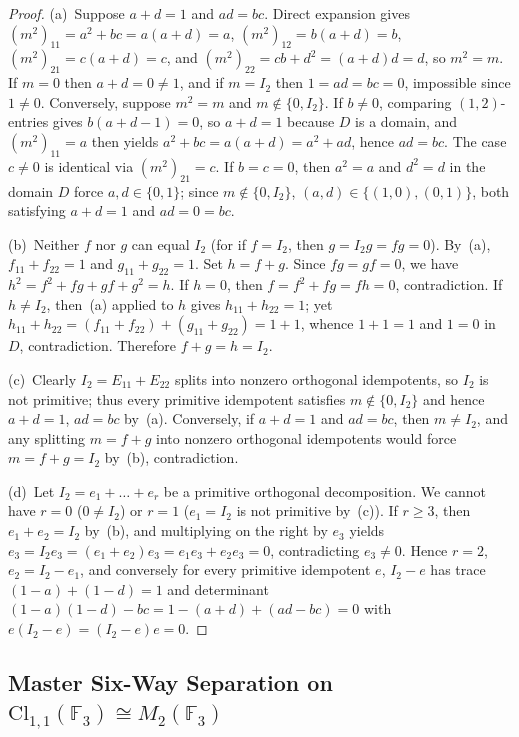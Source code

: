 \documentclass[11pt]{article}
\theoremstyle{definition}
\newcommand{\Cl}{\mathrm{Cl}}
\newcommand{\Mat}{M}
\newcommand{\F}{\mathbb{F}}
\begin{document}
\begin{proof}
(a)~Suppose $a + d = 1$ and $ad = bc$. Direct expansion gives
$(m^2)_{11} = a^2 + bc = a(a+d) = a$, $(m^2)_{12} = b(a+d) = b$,
$(m^2)_{21} = c(a+d) = c$, and $(m^2)_{22} = cb + d^2 = (a+d)d = d$, so
$m^2 = m$. If $m = 0$ then $a + d = 0 \neq 1$, and if $m = I_2$ then
$1 = ad = bc = 0$, impossible since $1 \neq 0$. Conversely, suppose $m^2 = m$
and $m \notin \{0, I_2\}$. If $b \neq 0$, comparing $(1,2)$-entries gives
$b(a+d-1) = 0$, so $a + d = 1$ because $D$ is a domain, and $(m^2)_{11} = a$
then yields $a^2 + bc = a(a+d) = a^2 + ad$, hence $ad = bc$. The case $c \neq 0$
is identical via $(m^2)_{21} = c$. If $b = c = 0$, then $a^2 = a$ and $d^2 = d$
in the domain $D$ force $a, d \in \{0,1\}$; since $m \notin \{0, I_2\}$,
$(a,d) \in \{(1,0),(0,1)\}$, both satisfying $a + d = 1$ and $ad = 0 = bc$.

(b)~Neither $f$ nor $g$ can equal $I_2$ (for if $f = I_2$, then $g = I_2 g = fg = 0$).
By~(a), $f_{11} + f_{22} = 1$ and $g_{11} + g_{22} = 1$. Set $h = f + g$. Since
$fg = gf = 0$, we have $h^2 = f^2 + fg + gf + g^2 = h$. If $h = 0$, then
$f = f^2 + fg = fh = 0$, contradiction. If $h \neq I_2$, then~(a) applied to $h$
gives $h_{11} + h_{22} = 1$; yet $h_{11} + h_{22} = (f_{11} + f_{22}) +
(g_{11} + g_{22}) = 1 + 1$, whence $1 + 1 = 1$ and $1 = 0$ in $D$, contradiction.
Therefore $f + g = h = I_2$.

(c)~Clearly $I_2 = E_{11} + E_{22}$ splits into nonzero orthogonal idempotents,
so $I_2$ is not primitive; thus every primitive idempotent satisfies
$m \notin \{0, I_2\}$ and hence $a + d = 1$, $ad = bc$ by~(a). Conversely, if
$a + d = 1$ and $ad = bc$, then $m \neq I_2$, and any splitting $m = f + g$ into
nonzero orthogonal idempotents would force $m = f + g = I_2$ by~(b), contradiction.

(d)~Let $I_2 = e_1 + \dots + e_r$ be a primitive orthogonal decomposition. We
cannot have $r = 0$ ($0 \neq I_2$) or $r = 1$ ($e_1 = I_2$ is not primitive by~(c)).
If $r \ge 3$, then $e_1 + e_2 = I_2$ by~(b), and multiplying on the right by
$e_3$ yields $e_3 = I_2 e_3 = (e_1 + e_2)e_3 = e_1 e_3 + e_2 e_3 = 0$,
contradicting $e_3 \neq 0$. Hence $r = 2$, $e_2 = I_2 - e_1$, and conversely for
every primitive idempotent $e$, $I_2 - e$ has trace $(1-a) + (1-d) = 1$ and
determinant $(1-a)(1-d) - bc = 1 - (a+d) + (ad - bc) = 0$ with
$e(I_2 - e) = (I_2 - e)e = 0$.
\end{proof}

\subsection{Master Six-Way Separation on \texorpdfstring{$\Cl_{1,1}(\F_3) \cong \Mat_2(\F_3)$}{Cl\_\{1,1\}(F\_3) = M\_2(F\_3)}}
\end{document}
